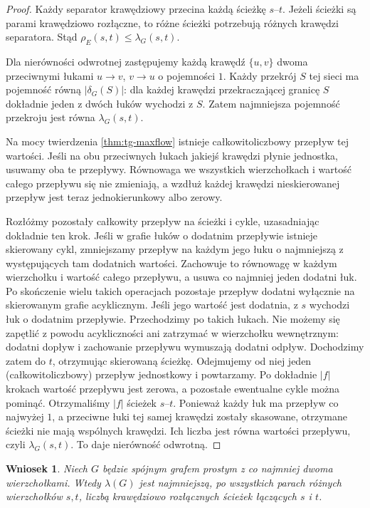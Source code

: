 \documentclass[11pt,a4paper]{report}
\numberwithin{equation}{section}
\theoremstyle{plain}
\newtheorem{wniosek}[twierdzenie]{Wniosek}
\theoremstyle{definition}
\theoremstyle{remark}
\begin{document}
\begin{proof}
Każdy separator krawędziowy przecina każdą ścieżkę
$s$--$t$. Jeżeli ścieżki są parami krawędziowo rozłączne,
to różne ścieżki potrzebują różnych krawędzi separatora.
Stąd $\rho_E(s,t)\le\lambda_G(s,t)$.

Dla nierówności odwrotnej zastępujemy każdą krawędź
$\{u,v\}$ dwoma przeciwnymi łukami $u\to v$, $v\to u$
o pojemności $1$. Każdy przekrój $S$ tej sieci ma
pojemność równą $|\delta_G(S)|$: dla każdej krawędzi
przekraczającej granicę $S$ dokładnie jeden z dwóch
łuków wychodzi z $S$. Zatem najmniejsza pojemność
przekroju jest równa $\lambda_G(s,t)$.

Na mocy twierdzenia \ref{thm:tg-maxflow} istnieje
całkowitoliczbowy przepływ tej wartości. Jeśli na
obu przeciwnych łukach jakiejś krawędzi płynie
jednostka, usuwamy oba te przepływy. Równowaga
we wszystkich wierzchołkach i wartość całego
przepływu się nie zmieniają, a wzdłuż każdej
krawędzi nieskierowanej przepływ jest teraz
jednokierunkowy albo zerowy.

Rozłóżmy pozostały całkowity przepływ na ścieżki
i cykle, uzasadniając dokładnie ten krok. Jeśli w grafie
łuków o dodatnim przepływie istnieje skierowany cykl,
zmniejszamy przepływ na każdym jego łuku o najmniejszą
z występujących tam dodatnich wartości. Zachowuje to
równowagę w każdym wierzchołku i wartość całego przepływu,
a usuwa co najmniej jeden dodatni łuk. Po skończenie wielu
takich operacjach pozostaje przepływ dodatni wyłącznie
na skierowanym grafie acyklicznym.
Jeśli jego wartość jest dodatnia, z $s$ wychodzi łuk
o dodatnim przepływie. Przechodzimy po takich łukach.
Nie możemy się zapętlić z powodu acykliczności ani
zatrzymać w wierzchołku wewnętrznym: dodatni dopływ
i zachowanie przepływu wymuszają dodatni odpływ.
Dochodzimy zatem do $t$, otrzymując skierowaną ścieżkę.
Odejmujemy od niej jeden (całkowitoliczbowy) przepływ
jednostkowy i powtarzamy. Po dokładnie $|f|$ krokach
wartość przepływu jest zerowa, a pozostałe ewentualne
cykle można pominąć. Otrzymaliśmy $|f|$ ścieżek $s$--$t$.
Ponieważ każdy łuk ma przepływ co najwyżej $1$,
a przeciwne łuki tej samej krawędzi zostały skasowane,
otrzymane ścieżki nie mają wspólnych krawędzi.
Ich liczba jest równa wartości przepływu,
czyli $\lambda_G(s,t)$. To daje nierówność odwrotną.
\end{proof}

\begin{wniosek}
Niech $G$ będzie spójnym grafem prostym z co najmniej
dwoma wierzchołkami. Wtedy $\lambda(G)$ jest najmniejszą,
po wszystkich parach różnych wierzchołków $s,t$,
liczbą krawędziowo rozłącznych ścieżek łączących $s$ i $t$.
\end{wniosek}
\end{document}
